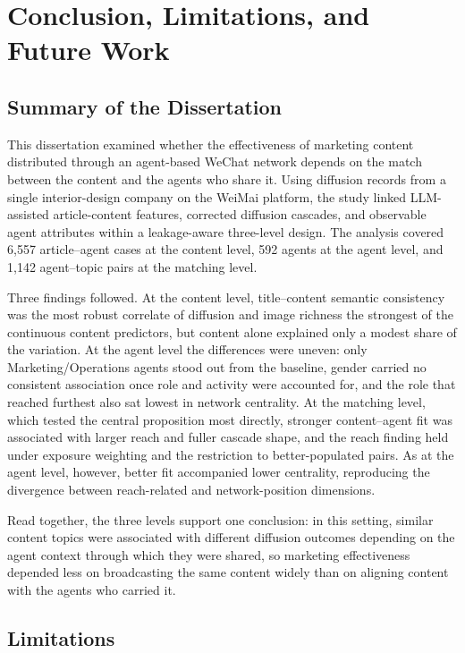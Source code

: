 ﻿\chapter{Conclusion, Limitations, and Future Work}
\label{chap:conclusion-limitations-and-future-work}

\section{Summary of the Dissertation}
\label{sec:8-1-summary-of-the-dissertation}

This dissertation examined whether the effectiveness of marketing content distributed through an agent-based WeChat network depends on the match between the content and the agents who share it. Using diffusion records from a single interior-design company on the WeiMai platform, the study linked LLM-assisted article-content features, corrected diffusion cascades, and observable agent attributes within a leakage-aware three-level design. The analysis covered 6,557 article–agent cases at the content level, 592 agents at the agent level, and 1,142 agent–topic pairs at the matching level.

Three findings followed. At the content level, title–content semantic consistency was the most robust correlate of diffusion and image richness the strongest of the continuous content predictors, but content alone explained only a modest share of the variation. At the agent level the differences were uneven: only Marketing/Operations agents stood out from the baseline, gender carried no consistent association once role and activity were accounted for, and the role that reached furthest also sat lowest in network centrality. At the matching level, which tested the central proposition most directly, stronger content–agent fit was associated with larger reach and fuller cascade shape, and the reach finding held under exposure weighting and the restriction to better-populated pairs. As at the agent level, however, better fit accompanied lower centrality, reproducing the divergence between reach-related and network-position dimensions.

Read together, the three levels support one conclusion: in this setting, similar content topics were associated with different diffusion outcomes depending on the agent context through which they were shared, so marketing effectiveness depended less on broadcasting the same content widely than on aligning content with the agents who carried it.

\section{Limitations}
\label{sec:8-2-limitations}

